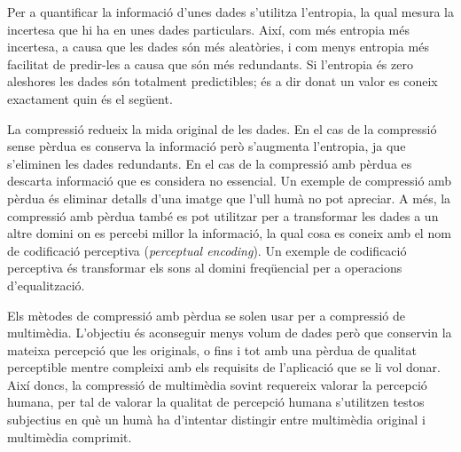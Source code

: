 Per a quantificar la informació d'unes dades s'utilitza l'entropia, la
qual mesura la incertesa que hi ha en unes dades particulars. Així,
com més entropia més incertesa, a causa que les dades són més
aleatòries, i com menys entropia més facilitat de predir-les a causa
que són més redundants. Si l'entropia és zero aleshores les dades són
totalment predictibles; és a dir donat un valor es coneix exactament
quin és el següent.




La compressió redueix la mida original de les dades. En el cas de la
compressió sense pèrdua es conserva la informació però s'augmenta
l'entropia, ja que s'eliminen les dades redundants. En el cas de la
compressió amb pèrdua es descarta informació que es considera no
essencial. Un exemple de compressió amb pèrdua és eliminar detalls
d'una imatge que l'ull humà no pot apreciar. A més, la compressió amb
pèrdua també es pot utilitzar per a transformar les dades a un altre
domini on es percebi millor la informació, la qual cosa es coneix amb
el nom de codificació perceptiva (\emph{perceptual encoding}). Un
exemple de codificació perceptiva és transformar els sons al domini
freqüencial per a operacions d'equalització.



Els mètodes de compressió amb pèrdua se solen usar per a compressió de
multimèdia. L'objectiu és aconseguir menys volum de dades però que
conservin la mateixa percepció que les originals, o fins i tot amb una
pèrdua de qualitat perceptible mentre compleixi amb els requisits de
l'aplicació que se li vol donar. Així doncs, la compressió de
multimèdia sovint requereix valorar la percepció humana, per tal de
valorar la qualitat de percepció humana s'utilitzen testos subjectius
en què un humà ha d'intentar distingir entre multimèdia original i
multimèdia comprimit.






